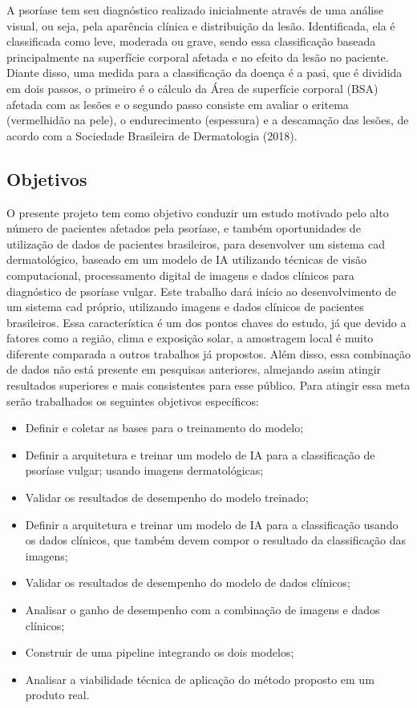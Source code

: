 A psoríase tem seu diagnóstico realizado inicialmente através de uma análise visual, ou seja, pela aparência clínica e distribuição da lesão. Identificada, ela é classificada como leve, moderada ou grave, sendo essa classificação baseada principalmente na superfície corporal afetada e no efeito da lesão no paciente. Diante disso, uma medida para a classificação da doença é a \gls{pasi}, que é dividida em dois passos, o primeiro é o cálculo da Área de superfície corporal (BSA) afetada com as lesões e o segundo passo consiste em avaliar o eritema (vermelhidão na pele), o endurecimento (espessura) e a descamação das lesões, de acordo com a Sociedade Brasileira de Dermatologia (2018).

\subsection{Objetivos}
O presente projeto tem como objetivo conduzir um estudo motivado pelo alto número de pacientes afetados pela psoríase, e também oportunidades de utilização de dados de pacientes brasileiros, para desenvolver um sistema \gls{cad} dermatológico, baseado em um modelo de \acs{IA} utilizando técnicas de visão computacional, processamento digital de imagens e dados clínicos para diagnóstico de psoríase vulgar. Este trabalho dará início ao desenvolvimento de um sistema \gls{cad} próprio,  utilizando imagens e dados clínicos de pacientes brasileiros. Essa característica é um dos pontos chaves do estudo, já que devido a fatores como a região, clima e exposição solar, a amostragem local é muito diferente comparada a outros trabalhos já propostos. Além disso,  essa combinação de dados não está presente em pesquisas anteriores, almejando assim atingir resultados superiores e mais consistentes para esse público. Para atingir essa meta serão trabalhados os seguintes objetivos específicos:
\begin{itemize}
  \item Definir e coletar as bases para o treinamento do modelo;
  \item Definir a arquitetura e treinar um modelo de \acs{IA} para a classificação de psoríase vulgar; usando imagens dermatológicas;
  \item Validar os resultados de desempenho do modelo treinado;
  \item Definir a arquitetura e treinar um modelo de \acs{IA} para a classificação usando os dados clínicos, que também devem compor o resultado da classificação das imagens;

  \item Validar os resultados de desempenho do modelo de dados clínicos;
  \item Analisar o ganho de desempenho com a combinação de imagens e dados clínicos;
  \item Construir de uma pipeline integrando os dois modelos;
  \item Analisar a viabilidade técnica de aplicação do método proposto em um produto real.

\end{itemize}
